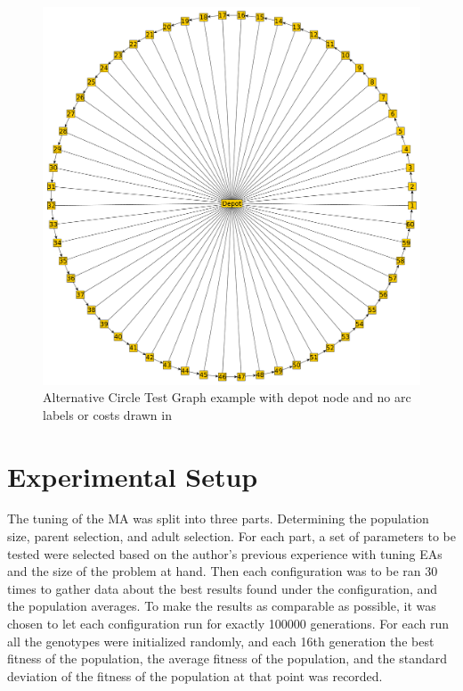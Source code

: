 \begin{figure}[thbp]
	\centerline{\includegraphics[width=\textwidth]{figures/CircleTests/CircleTestIllustrations/Circle_Test_Graph_Central_Depot-No_arc_or_edge_labels_or_costs.pdf}}
	\caption{Alternative Circle Test Graph example with depot node and no arc labels or costs drawn in}
	\label{fig:ctgcdnaoeloc}
\end{figure}



\clearpage

\section{Experimental Setup} %
\label{sec:experimental_setup}
The tuning of the MA was split into three parts. Determining the population size, parent selection, and adult selection. 
For each part, a set of parameters to be tested were selected based on the author's previous experience with tuning EAs and the size of the problem at hand. Then each configuration was to be ran 30 times to gather data about the best results found under the configuration, and the population averages. To make the results as comparable as possible, it was chosen to let each configuration run for exactly 100000 generations. For each run all the genotypes were initialized randomly, and each 16th generation the best fitness of the population, the average fitness of the population, and the standard deviation of the fitness of the population at that point was recorded.

